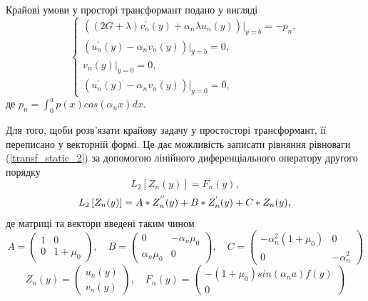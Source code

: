 Крайові умови у просторі трансформант подано у вигляді
\begin{equation}\label{transf_bound_static_2}
    \begin{cases}
        \left( (2G + \lambda)v_n^{'}(y) + \alpha_n \lambda u_n(y) \right)|_{y=b} = -p_n, \\
        \left(u_n^{'}(y) - \alpha_n v_n(y)  \right)|_{y=b} = 0, \\
        v_n(y)|_{y=0} = 0, \\
        \left(u_n^{'}(y) - \alpha_n v_n(y)  \right)|_{y=0} = 0,
    \end{cases}
\end{equation}
де $p_n = \int_{0}^{a} p(x) cos(\alpha_n x) dx$.

Для того, щоби розв'язати крайову задачу у простосторі трансформант, її переписано у векторній формі.
Це дає можливість записати рівняння рівноваги (\ref{transf_static_2}) за допомогою лінійного диференціального оператору другого порядку
\begin{equation}\label{transf_mat_static_2}
    L_2\left[ Z_n(y) \right] = F_n(y),
\end{equation}
\begin{equation}
    L_2\left[ Z_n(y) \right] = A * Z_n^{''}(y) + B * Z_n^{'}(y) + C * Z_n(y), \nonumber \\
\end{equation}
де матриці та вектори введені таким чином
\begin{equation*}
    A = \begin{pmatrix}
        1 & 0 \\
        0 & 1 + \mu_0
    \end{pmatrix}, \quad
    B = \begin{pmatrix}
        0 & -\alpha_n \mu_0 \\
        \alpha_n \mu_0 & 0
    \end{pmatrix}, \quad
    C = \begin{pmatrix}
        -\alpha_n^2(1 + \mu_0) & 0 \\
        0 & -\alpha_n^2
    \end{pmatrix}
\end{equation*}
\begin{equation*}
    Z_n(y) = \begin{pmatrix}
        u_n(y) \\
        v_n(y)
    \end{pmatrix}, \quad 
    F_n(y) = \begin{pmatrix}
        -(1 + \mu_0)sin(\alpha_n a) f(y) \\
        0
    \end{pmatrix}
\end{equation*}
